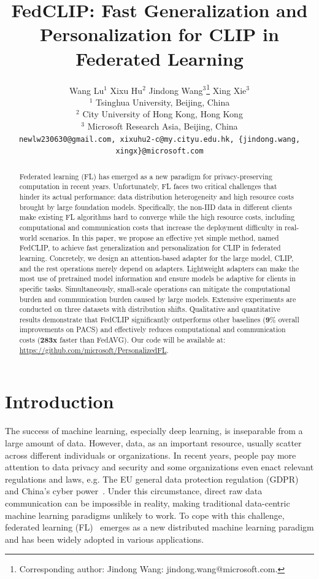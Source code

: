 \documentclass[11pt]{article}
\title{FedCLIP: Fast Generalization and Personalization for CLIP in Federated Learning}
\author{Wang Lu$^1$
\hspace{2em} Xixu Hu$^2$
\hspace{2em} Jindong Wang$^{3}$\thanks{Corresponding author: Jindong Wang: jindong.wang@microsoft.com.}
\hspace{2em} Xing Xie$^{3}$\\
$^{1}$ Tsinghua University, Beijing, China \\
$^{2}$ City University of Hong Kong, Hong Kong\\
$^{3}$ Microsoft Research Asia, Beijing, China \\
\texttt{\small newlw230630@gmail.com, xixuhu2-c@my.cityu.edu.hk, \{jindong.wang, xingx\}@microsoft.com}\\
}
\newcommand{\method}{FedCLIP\xspace}
\newcommand{\wjdd}[1]{\todo[linecolor=cyan,backgroundcolor=cyan!25,bordercolor=cyan,size=\scriptsize]{(WJD): #1}}
\newcommand{\wjd}[1]{{\color{cyan}{[(WJD): #1]}}}
\begin{document}
\maketitle
\begin{abstract}
Federated learning (FL) has emerged as a new paradigm for privacy-preserving computation in recent years.
Unfortunately, FL faces two critical challenges that hinder its actual performance: data distribution heterogeneity and high resource costs brought by large foundation models.
Specifically, the non-IID data in different clients make existing FL algorithms hard to converge while the high resource costs, including computational and communication costs that increase the deployment difficulty in real-world scenarios.
In this paper, we propose an effective yet simple method, named \method, to achieve fast generalization and personalization for CLIP in federated learning.
Concretely, we design an attention-based adapter for the large model, CLIP, and the rest operations merely depend on adapters. %
Lightweight adapters can make the most use of pretrained model information and ensure models be adaptive for clients in specific tasks.
Simultaneously, small-scale operations can mitigate the computational burden and communication burden caused by large models.
Extensive experiments are conducted on three datasets with distribution shifts.
Qualitative and quantitative results demonstrate that \method significantly outperforms other baselines ($\mathbf{9}\%$ overall improvements on PACS) and effectively reduces computational and communication costs ($\textbf{283x}$ faster than FedAVG). %
Our code will be available at: \url{https://github.com/microsoft/PersonalizedFL}.
\end{abstract}

\section{Introduction}

The success of machine learning, especially deep learning, is inseparable from a large amount of data.
However, data, as an important resource, usually scatter across different individuals or organizations.
In recent years, people pay more attention to data privacy and security and some organizations even enact relevant regulations and laws, e.g. The EU general data protection regulation (GDPR)~\cite{Jindong-voigt2017eu} and China's cyber power~\cite{Jindong-inkster2018china}.
Under this circumstance, direct raw data communication can be impossible in reality, making traditional data-centric machine learning paradigms unlikely to work.
To cope with this challenge, federated learning (FL)~\cite{Jindong-yang2019federated} emerges as a new distributed machine learning paradigm and has been widely adopted in various applications.
\end{document}

